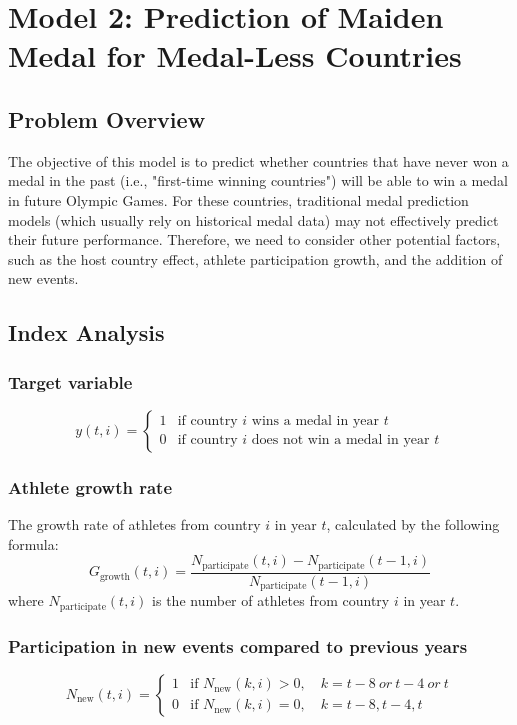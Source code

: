 \documentclass{mcmthesis}
\begin{document}
\section{Model 2: Prediction of Maiden Medal for Medal-Less Countries}


\subsection{Problem Overview}
The objective of this model is to predict whether countries that have never won a medal in the past (i.e., "first-time winning countries") will be able to win a medal in future Olympic Games. For these countries, traditional medal prediction models (which usually rely on historical medal data) may not effectively predict their future performance. Therefore, we need to consider other potential factors, such as the host country effect, athlete participation growth, and the addition of new events.


\subsection{Index Analysis}


\subsubsection{Target variable}
\[
y(t,i) = 
\begin{cases} 
	1 & \text{if country } i \text{ wins a medal in year } t \\ 
	0 & \text{if country } i \text{ does not win a medal in year } t 
\end{cases}
\]
\subsubsection{Athlete growth rate}
The growth rate of athletes from country $i$ in year $t$, calculated by the following formula:
\[
G_{\text{growth}}(t,i) = \frac{N_{\text{participate}}(t,i) - N_{\text{participate}}(t-1,i)}{N_{\text{participate}}(t-1,i)}
\]
where $N_{\text{participate}}(t,i)$ is the number of athletes from country $i$ in year $t$.


\subsubsection{Participation in new events compared to previous years} 
\[
N_{\text{new}}(t,i) =
\begin{cases}
	1 & \text{if } N_{\text{new}}(k,i) > 0, \quad k = t-8\ or\ t-4\ or\ t \\
	0 & \text{if } N_{\text{new}}(k,i) = 0, \quad k = t-8, t-4, t
\end{cases}
\]
\end{document}
